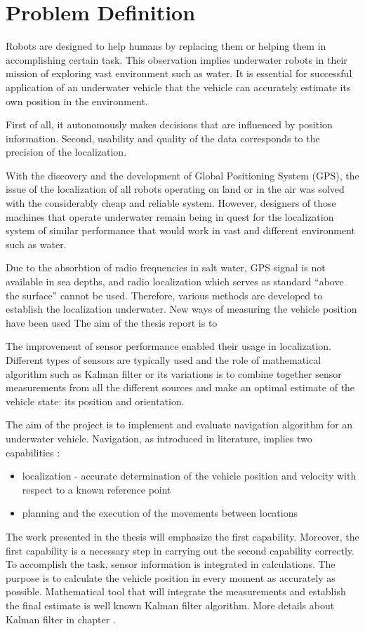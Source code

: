\chapter{Problem Definition} \label{chap:problem-def}

Robots are designed to help humans by replacing them or helping them in accomplishing certain task. This observation implies underwater robots in their mission of exploring vast environment such as water. It is essential for successful application of an underwater vehicle that the vehicle can accurately estimate its own position in the environment.  

First of all, it autonomously makes decisions that are influenced by position information. Second, usability and quality of the data corresponds to the precision of the localization.

With the discovery and the development of Global Positioning System (GPS), the issue of the localization of all robots operating on land or in the air was solved with the considerably cheap and reliable system. However, designers of those machines that operate underwater remain being in quest for the localization system of similar performance that would work in vast and different environment such as water.

Due to the absorbtion of radio frequencies in salt water, GPS signal is not available in sea depths, and radio localization which serves as standard ``above the surface'' cannot be used. Therefore, various methods are developed to establish the localization underwater. New ways of measuring the vehicle position have been used  The aim of the thesis report is to  

The improvement of sensor performance enabled their usage in localization. Different types of sensors are typically used and the role of mathematical algorithm such as Kalman filter or its variations is to combine together sensor measurements from all the different sources and make an optimal estimate of the vehicle state: its position and orientation. 

The aim of the project is to implement and evaluate navigation algorithm for an underwater vehicle. Navigation, as introduced in literature, implies two capabilities \cite{farrell98}:
\begin{itemize}
\item localization - accurate determination of the vehicle position and velocity with respect to a known reference point
\item planning and the execution of the movements between locations   
\end{itemize} 
The work presented in the thesis will emphasize the first capability. Moreover, the first capability is a necessary step in carrying out the second capability correctly. To accomplish the task, sensor information is integrated in calculations. The purpose is to calculate the vehicle position in every moment as accurately as possible. Mathematical tool that will integrate the measurements and establish the final estimate is well known Kalman filter \cite{} algorithm. More details about Kalman filter in chapter \label{chap:KalmanFilter}. 


